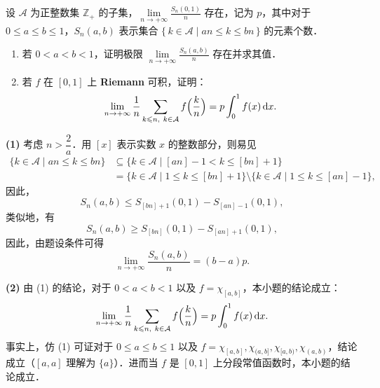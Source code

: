 设 $\mathcal{A}$ 为正整数集 $\mathbb{Z}_+$ 的子集，$\lim\limits_{n\to+\infty}\frac{S_n(0,1)}{n}$ 存在，记为 $p$，其中对于 $0\leqslant a\leqslant b\leqslant 1$，$S_n(a,b)$ 表示集合 $\{\,k\in\mathcal{A}\mid an\leqslant k\leqslant bn\,\}$ 的元素个数．
\begin{enumerate}[label=(\arabic*)]
  \item 若 $0<a<b<1$，证明极限 $\lim\limits_{n\to+\infty}\frac{S_n(a,b)}{n}$ 存在并求其值．
  \item 若 $f$ 在 $[0,1]$ 上 \textbf{Riemann} 可积，证明：
  \[
    \lim_{n\to+\infty}\frac{1}{n}\sum_{k\leqslant n,\ k\in\mathcal{A}}f\Bigl(\frac{k}{n}\Bigr)=p\int_0^1 f(x)\dd x.
  \]
\end{enumerate}
\begin{solution}
\textbf{(1)} 考虑 $n>\dfrac{2}{a}$．用 $[x]$ 表示实数 $x$ 的整数部分，则易见
\begin{align*}
\{k\in\mathcal{A}\mid an\leqslant k\leqslant bn\}
&\subseteq\{k\in\mathcal{A}\mid [an]-1<k\leqslant [bn]+1\}\\
&=\{k\in\mathcal{A}\mid 1\leqslant k\leqslant [bn]+1\}\setminus\{k\in\mathcal{A}\mid 1\leqslant k\leqslant [an]-1\},
\end{align*}
因此，
\[
S_n(a,b)\leqslant S_{[bn]+1}(0,1)-S_{[an]-1}(0,1),
\]
类似地，有
\[
S_n(a,b)\geqslant S_{[bn]}(0,1)-S_{[an]+1}(0,1),
\]
因此，由题设条件可得
\[
\lim_{n\to+\infty}\frac{S_n(a,b)}{n}=(b-a)p.
\]

\textbf{(2)} 由 (1) 的结论，对于 $0<a<b<1$ 以及 $f=\chi_{[a,b]}$，本小题的结论成立：
\[
\lim_{n\to+\infty}\frac{1}{n}\sum_{k\leqslant n,\ k\in\mathcal{A}}f\Bigl(\frac{k}{n}\Bigr)=p\int_0^1 f(x)\dd x.
\]
事实上，仿 (1) 可证对于 $0\leqslant a\leqslant b\leqslant 1$ 以及 $f=\chi_{[a,b]},\chi_{(a,b]},\chi_{[a,b)},\chi_{(a,b)}$，结论成立（$[a,a]$ 理解为 $\{a\}$）．进而当 $f$ 是 $[0,1]$ 上分段常值函数时，本小题的结论成立．


\end{solution}
